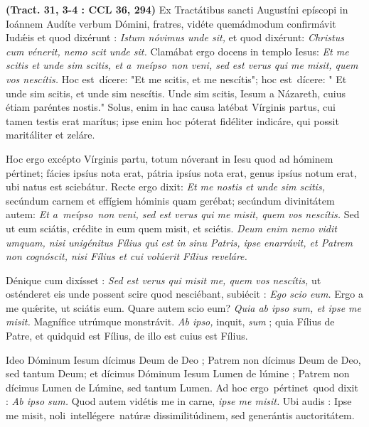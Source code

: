 \documentclass[options]{article}
\begin{document}
	\textbf{(Tract. 31, 3-4 : CCL 36, 294)}
	Ex Tractátibus sancti Augustíni epíscopi in Ioánnem 
	Audíte verbum Dómini, fratres, vidéte quemádmodum confirmávit Iud\'{æ}is et quod dixérunt : 
	\textit{Istum nóvimus unde sit,}
 et quod dixérunt:
 \textit{Christus cum vénerit, nemo scit unde sit.}
  Clamábat ergo docens in templo Iesus: 
  \textit{Et me scitis et unde sim scitis, et a meípso non veni, sed est verus qui me misit, quem vos nescítis.}
  Hoc est dícere: "Et me scitis, et me nescítis"; hoc est dícere: " Et unde sim scitis, et unde sim nescítis. Unde sim scitis, Iesum a Názareth, cuius étiam paréntes nostis." Solus, enim in hac causa latébat Vírginis partus, cui tamen testis erat marítus; ipse enim hoc póterat fidéliter indicáre, qui possit maritáliter et zeláre.
	

Hoc ergo excépto Vírginis partu, totum nóverant in Iesu quod ad hóminem pértinet; fácies ipsíus nota erat, pátria ipsíus nota erat, genus ipsíus notum erat, ubi natus est sciebátur. Recte ergo dixit:
\textit{Et me nostis et unde sim scitis,}
secúndum carnem et effígiem hóminis quam gerébat; secúndum divinitátem autem: 
 \textit{Et a meípso non veni, sed est verus qui me misit, quem vos nescítis.}
 Sed ut eum sciátis, crédite in eum quem misit, et sciétis. 
 \textit{Deum enim nemo vidit umquam, nisi unigénitus Fílius qui est in sinu Patris, ipse enarrávit, et Patrem non cognóscit, nisi Fílius et cui volúerit Fílius reveláre.}
 
 Dénique cum dixísset : 
 \textit{Sed est verus qui misit me, quem vos nescítis,}
 ut osténderet eis unde possent scire quod nesciébant, subiécit : 
\textit{Ego scio eum.} 
Ergo a me qu\'{æ}rite, ut sciátis eum. Quare autem scio eum? 
\textit{Quia ab ipso sum, et ipse me misit.}
Magnífice utrúmque monstrávit. 
\textit{Ab ipso,}
inquit,
\textit{sum} ; quia Fílius de Patre, et quidquid est Fílius, de illo est cuius est Fílius.
	
Ideo Dóminum Iesum dícimus Deum de Deo ; Patrem non dícimus Deum de Deo, sed tantum Deum; et dícimus Dóminum Iesum Lumen de lúmine ; Patrem non dícimus Lumen de Lúmine, sed tantum Lumen. Ad hoc ergo pértinet quod dixit : 
\textit{Ab ipso sum.}
Quod autem vidétis me in carne, 
\textit{ipse me misit.}
Ubi audis : Ipse me misit, noli intellégere natúræ dissimilitúdinem, sed generántis auctoritátem.
	
	
\end{document}
